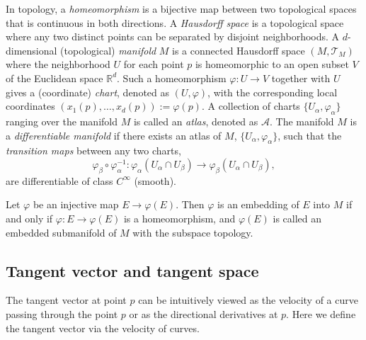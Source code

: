 \documentclass[11pt,a4paper,]{article}
\begin{document}
In topology, a \emph{homeomorphism} is a bijective map between two topological spaces that is continuous in both directions.
A \emph{Hausdorff space} is a topological space where any two distinct points can be separated by disjoint neighborhoods.
A \(d\)-dimensional (topological) \emph{manifold} \(M\) is a connected Hausdorff space \((M, \mathcal{T}_M)\) where the neighborhood \(U\) for each point \(p\) is homeomorphic to an open subset \(V\) of the Euclidean space \(\mathbb{R}^d\). Such a homeomorphism \(\varphi: U \rightarrow V\) together with \(U\) gives a (coordinate) \emph{chart}, denoted as \((U, \varphi)\), with the corresponding local coordinates \((x_1(p),\dots, x_d(p)) := \varphi(p)\). A collection of charts \(\{U_\alpha, \varphi_\alpha\}\) ranging over the manifold \(M\) is called an \emph{atlas}, denoted as \(\mathcal{A}\).
The manifold \(M\) is a \emph{differentiable manifold} if there exists an atlas of \(M\), \(\{U_\alpha, \varphi_\alpha\}\), such that the \emph{transition maps} between any two charts,
\[
\varphi_\beta \circ \varphi_\alpha^{-1}: \varphi_\alpha(U_\alpha \cap U_\beta) \rightarrow \varphi_\beta(U_\alpha \cap U_\beta),
\]
are differentiable of class \(C^\infty\) (smooth).

Let \(\varphi\) be an injective map \(E \rightarrow \varphi(E)\). Then \(\varphi\) is an embedding of \(E\) into \(M\) if and only if \(\varphi: E \rightarrow \varphi(E)\) is a homeomorphism, and \(\varphi(E)\) is called an embedded submanifold of \(M\) with the subspace topology.

\hypertarget{tangent-vector-and-tangent-space}{%
\subsection{Tangent vector and tangent space}\label{tangent-vector-and-tangent-space}}

The tangent vector at point \(p\) can be intuitively viewed as the velocity of a curve passing through the point \(p\) or as the directional derivatives at \(p\). Here we define the tangent vector via the velocity of curves.
\end{document}
